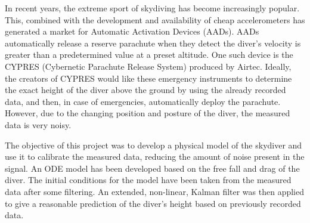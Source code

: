 
In recent years, the extreme sport of skydiving has become increasingly popular. This, combined with the development
and availability of cheap accelerometers has generated a market for Automatic Activation Devices (AADs). AADs
automatically release a reserve parachute when they detect the diver's velocity is greater than a predetermined
value at a preset altitude. One such device is the CYPRES (Cybernetic Parachute Release System) produced by Airtec.
Ideally, the creators of CYPRES would like these emergency instruments to determine the exact height of the diver above the ground by using the already recorded data, and then, in case of emergencies, automatically deploy the parachute. However, due to the changing position and posture of the diver, the measured data
 is very noisy. 
 
 The objective of this project was to develop a physical model of the skydiver and use it to calibrate the measured data, reducing the amount of noise present in the signal. An ODE model has been developed based on the free fall and drag of the diver. The initial conditions for the model have been taken from the measured data after some filtering. An extended, non-linear, Kalman filter was then applied to give a reasonable prediction of the diver's height based on previously recorded data.
 
